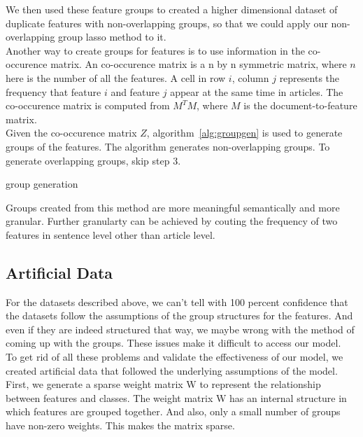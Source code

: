 \documentclass[11pt]{article}
\begin{document}
We then used these feature groups to created a higher dimensional dataset of
duplicate features with non-overlapping groups, so that we could apply our
non-overlapping group lasso method to it.\\

Another way to create groups for features is to use information in the co-occurence matrix. An co-occurence matrix is a n by n symmetric matrix, where $n$ here is the number of all the features. A cell in row $i$, column $j$ represents the frequency that feature $i$ and feature $j$ appear at the same time in articles. The co-occurence matrix is computed from $M^T M$, where $M$ is the document-to-feature matrix. \\

Given the co-occurence matrix $Z$, algorithm~\ref{alg:groupgen}  is used to
 generate groups of the features. The algorithm generates 
 non-overlapping groups. To generate overlapping groups, skip step 3.

\begin{algorithm}
\caption{group generation}
\label{alg:groupgen}
\end{algorithm}

Groups created from this method are more meaningful semantically and more 
granular. 
Further granularty can be achieved by couting the frequency of two features in sentence level other than article level.

\subsection{Artificial Data}

For the datasets described above, we can't tell with 100 percent confidence that the datasets follow the assumptions of the group structures for the features. And even if they are indeed structured that way, we maybe wrong with the method of coming up with the groups. These issues make it difficult to access our model.\\ 

To get rid of all these problems and validate the effectiveness of our model, we created artificial data that followed the underlying assumptions of the model. First, we generate a sparse weight matrix W to represent the relationship between features and classes. The weight matrix W has an internal structure in which features are grouped together. And also, only a small number of groups have non-zero weights. This makes the matrix sparse.\\ 
\end{document}
